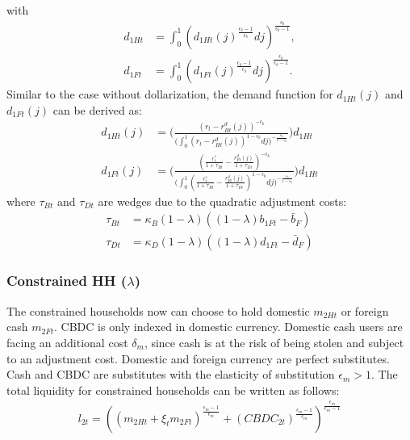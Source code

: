 \documentclass[12pt]{article}
\begin{document}
with 
\begin{align*}
d_{1Ht} &= \int_0^1({d_{1Ht}(j)}^{\frac{\epsilon_b-1}{\epsilon_b}}dj)^{\frac{\epsilon_b}{\epsilon_b-1}}, \\
d_{1Ft} &= \int_0^1({d_{1Ft}(j)}^{\frac{\epsilon_b-1}{\epsilon_b}}dj)^{\frac{\epsilon_b}{\epsilon_b-1}}.
\end{align*}
Similar to the case without dollarization, the demand function for $d_{1Ht}(j)$  and $d_{1Ft}(j)$ can be derived as:
\begin{align*}
d_{1Ht}(j) &= \Biggl(\frac{(r_t-r_{Ht}^d(j))^{-\epsilon_b}}{\big(\int_0^1(r_t-r_{Ht}^d(j))^{1-\epsilon_b}dj\big)^{-\frac{\epsilon_b}{1-\epsilon_b}}}\Biggl)d_{1Ht} \\
d_{1Ft}(j) &= \Biggl(\frac{(\frac{r_t^*}{1+\tau_{Bt}}-\frac{r_{Ft}^d(j)}{1+\tau_{Dt}})^{-\epsilon_b}}{\big(\int_0^1(\frac{r_t^*}{1+\tau_{Bt}}-\frac{r_{Ft}^d(j)}{1+\tau_{Dt}})^{1-\epsilon_b}dj\big)^{-\frac{\epsilon_b}{1-\epsilon_b}}}\Biggl)d_{1Ht}
\end{align*}
where $\tau_{Bt}$ and $\tau_{Dt}$ are wedges due to the quadratic adjustment costs: 
\begin{align*}
\tau_{Bt} &= \kappa_B(1-\lambda)((1-\lambda)b_{1Ft}-\bar{b}_F) \\
\tau_{Dt} &= \kappa_D(1-\lambda)((1-\lambda)d_{1Ft}-\bar{d}_F)
\end{align*}

\subsubsection*{Constrained HH  ($\lambda$)}
The constrained households now can choose to hold domestic $m_{2Ht}$ or foreign cash $m_{2Ft}$. CBDC is only indexed in domestic currency. 
Domestic cash users are facing an additional cost $\delta_m$, since cash is at the risk of being stolen and subject to an adjustment cost. Domestic and foreign currency are perfect substitutes. Cash and CBDC are substitutes with the elasticity of substitution $\epsilon_m>1$. The total liquidity for constrained households can be written as follows: 
\begin{align*}
l_{2t} = ((m_{2Ht}+\xi_t m_{2Ft})^{\frac{\epsilon_m-1}{\epsilon_m}}+(CBDC_{2t})^{\frac{\epsilon_m-1}{\epsilon_m}})^{\frac{\epsilon_m}{\epsilon_m-1}}
\end{align*}
\end{document}
